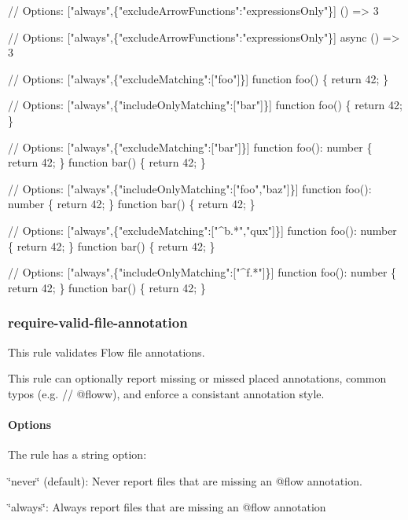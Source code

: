 \begin{DoxyCode}
// Options: ["always",\{"excludeArrowFunctions":"expressionsOnly"\}]
() => 3

// Options: ["always",\{"excludeArrowFunctions":"expressionsOnly"\}]
async () => 3

// Options: ["always",\{"excludeMatching":["foo"]\}]
function foo() \{ return 42; \}

// Options: ["always",\{"includeOnlyMatching":["bar"]\}]
function foo() \{ return 42; \}

// Options: ["always",\{"excludeMatching":["bar"]\}]
function foo(): number \{ return 42; \}
function bar() \{ return 42; \}

// Options: ["always",\{"includeOnlyMatching":["foo","baz"]\}]
function foo(): number \{ return 42; \}
function bar() \{ return 42; \}

// Options: ["always",\{"excludeMatching":["^b.*","qux"]\}]
function foo(): number \{ return 42; \}
function bar() \{ return 42; \}

// Options: ["always",\{"includeOnlyMatching":["^f.*"]\}]
function foo(): number \{ return 42; \}
function bar() \{ return 42; \}
\end{DoxyCode}


\label{_eslint-plugin-flowtype-rules-require-valid-file-annotation}%
 \subsubsection*{{\ttfamily require-\/valid-\/file-\/annotation}}

This rule validates Flow file annotations.

This rule can optionally report missing or missed placed annotations, common typos (e.\+g. {\ttfamily // @floww}), and enforce a consistant annotation style.

\label{_eslint-plugin-flowtype-rules-require-valid-file-annotation-options}%
 \paragraph*{Options}

The rule has a string option\+:


\begin{DoxyItemize}
\item {\ttfamily \char`\"{}never\char`\"{}} (default)\+: Never report files that are missing an {\ttfamily @flow} annotation.
\item {\ttfamily \char`\"{}always\char`\"{}}\+: Always report files that are missing an {\ttfamily @flow} annotation
\end{DoxyItemize}

